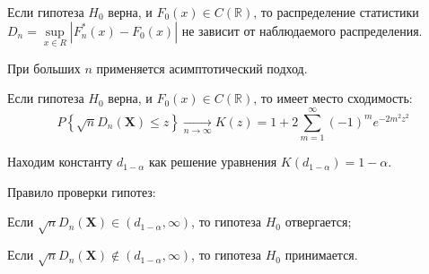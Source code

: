 \begin{lem}
Если гипотеза $H_0$ верна, и $F_{0}(x) \in C(\mathbb{R})$, то распределение статистики $D_{n}=\sup\limits_{x \in R}|F_{n}^{*}(x)-F_{0}(x)|$ не зависит от наблюдаемого распределения.
\end{lem}

При больших $n$ применяется асимптотический подход.
\begin{namedthm}
Если гипотеза $H_0$ верна, и $F_{0}(x) \in C(\mathbb{R})$, то имеет место сходимость:
\begin{equation*}
    P\left\{\sqrt{n} D_{n}\left(\mathbf{X}\right) \leqslant z\right\} \underset{n \rightarrow \infty}{\longrightarrow} K(z)=1+2 \sum\limits_{m=1}^{\infty}(-1)^{m} e^{-2 m^{2} z^{2}}
\end{equation*}
\end{namedthm}

Находим константу $d_{1-\alpha}$ как решение уравнения $K\left(d_{1-\alpha}\right)=1-\alpha$.

Правило проверки гипотез:
\begin{compactlist}
    \item Если $\sqrt{n} D_{n}\left(\mathbf{X}\right) \in\left(d_{1-\alpha}, \infty\right)$, то гипотеза $H_0$ отвергается;
    \item Если $\sqrt{n} D_{n}\left(\mathbf{X}\right) \notin\left(d_{1-\alpha}, \infty\right)$, то гипотеза $H_0$ принимается.
\end{compactlist}

